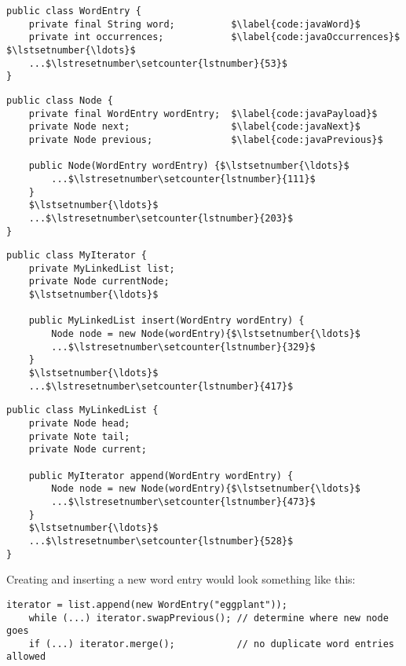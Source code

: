 \begin{lstlisting}[mathescape=true]
public class WordEntry {
    private final String word;          $\label{code:javaWord}$
    private int occurrences;            $\label{code:javaOccurrences}$ $\lstsetnumber{\ldots}$
    ...$\lstresetnumber\setcounter{lstnumber}{53}$
}
\end{lstlisting}

\begin{lstlisting}[firstnumber=100, mathescape=true]
public class Node {
    private final WordEntry wordEntry;  $\label{code:javaPayload}$
    private Node next;                  $\label{code:javaNext}$
    private Node previous;              $\label{code:javaPrevious}$

    public Node(WordEntry wordEntry) {$\lstsetnumber{\ldots}$
        ...$\lstresetnumber\setcounter{lstnumber}{111}$
    }
    $\lstsetnumber{\ldots}$
    ...$\lstresetnumber\setcounter{lstnumber}{203}$
}
\end{lstlisting}

\begin{lstlisting}[firstnumber=309, mathescape=true]
public class MyIterator {
    private MyLinkedList list;
    private Node currentNode;
    $\lstsetnumber{\ldots}$

    public MyLinkedList insert(WordEntry wordEntry) {
        Node node = new Node(wordEntry){$\lstsetnumber{\ldots}$
        ...$\lstresetnumber\setcounter{lstnumber}{329}$
    }
    $\lstsetnumber{\ldots}$
    ...$\lstresetnumber\setcounter{lstnumber}{417}$
\end{lstlisting}

\begin{lstlisting}[firstnumber=452, mathescape=true]
public class MyLinkedList {
    private Node head;
    private Note tail;
    private Node current;

    public MyIterator append(WordEntry wordEntry) {
        Node node = new Node(wordEntry){$\lstsetnumber{\ldots}$
        ...$\lstresetnumber\setcounter{lstnumber}{473}$
    }
    $\lstsetnumber{\ldots}$
    ...$\lstresetnumber\setcounter{lstnumber}{528}$
}
\end{lstlisting}

Creating and inserting a new word entry would look something like this:

\begin{lstlisting}[firstnumber=642, mathescape=true]
    iterator = list.append(new WordEntry("eggplant"));
    while (...) iterator.swapPrevious(); // determine where new node goes
    if (...) iterator.merge();           // no duplicate word entries allowed
\end{lstlisting}

